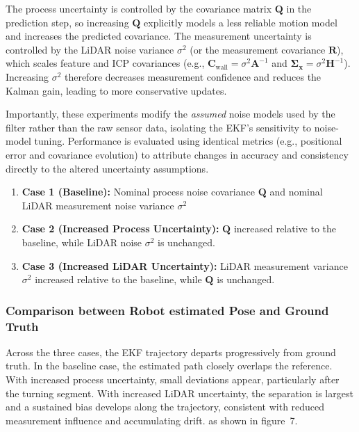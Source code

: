 \documentclass[11pt]{article}
\begin{document}
The process uncertainty is controlled by the covariance matrix $\mathbf{Q}$ in the prediction step, so increasing $\mathbf{Q}$ explicitly models a less reliable motion model and increases the predicted covariance. The measurement uncertainty is controlled by the LiDAR noise variance $\sigma^2$ (or the measurement covariance $\mathbf{R}$), which scales feature and ICP covariances (e.g., $\mathbf{C}_{\text{wall}} = \sigma^2 \mathbf{A}^{-1}$ and $\boldsymbol{\Sigma}_{\mathbf{x}} = \sigma^2 \mathbf{H}^{-1}$). Increasing $\sigma^2$ therefore decreases measurement confidence and reduces the Kalman gain, leading to more conservative updates.

Importantly, these experiments modify the \emph{assumed} noise models used by the filter rather than the raw sensor data, isolating the EKF’s sensitivity to noise-model tuning. Performance is evaluated using identical metrics (e.g., positional error and covariance evolution) to attribute changes in accuracy and consistency directly to the altered uncertainty assumptions.

\begin{enumerate}
	\item \textbf{Case 1 (Baseline):} Nominal process noise covariance $\mathbf{Q}$ and nominal LiDAR measurement noise variance $\sigma^2$ 
	\item \textbf{Case 2 (Increased Process Uncertainty):} $\mathbf{Q}$ increased relative to the baseline, while LiDAR noise $\sigma^2$ is unchanged. 
	\item \textbf{Case 3 (Increased LiDAR Uncertainty):} LiDAR measurement variance $\sigma^2$ increased relative to the baseline, while $\mathbf{Q}$ is unchanged.
\end{enumerate}


\subsubsection{Comparison between Robot estimated Pose and Ground Truth}

Across the three cases, the EKF trajectory departs progressively from ground truth. 
In the baseline case, the estimated path closely overlaps the reference. 
With increased process uncertainty, small deviations appear, particularly after the turning segment. 
With increased LiDAR uncertainty, the separation is largest and a sustained bias develops along the trajectory, consistent with reduced measurement influence and accumulating drift. as shown in figure~7.
\end{document}
